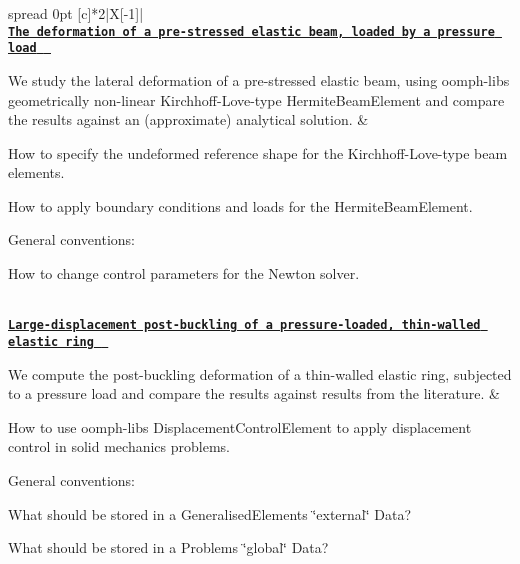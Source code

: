 \begin{longtabu} spread 0pt [c]{*{2}{|X[-1]}|}
\hline
{}\\
\href{../../beam/tensioned_string/html/index.html}{\tt {\bfseries The deformation of a pre-\/stressed elastic beam, loaded by a pressure load } }

We study the lateral deformation of a pre-\/stressed elastic beam, using {\ttfamily oomph-\/lib\textquotesingle{}s} geometrically non-\/linear Kirchhoff-\/\+Love-\/type {\ttfamily Hermite\+Beam\+Element} and compare the results against an (approximate) analytical solution.  &
\begin{DoxyItemize}
\item How to specify the undeformed reference shape for the Kirchhoff-\/\+Love-\/type beam elements.
\item How to apply boundary conditions and loads for the {\ttfamily Hermite\+Beam\+Element}.
\item General conventions\+:
\begin{DoxyItemize}
\item How to change control parameters for the Newton solver. 
\end{DoxyItemize}
\end{DoxyItemize}

\\
\href{../../beam/steady_ring/html/index.html}{\tt {\bfseries Large-\/displacement post-\/buckling of a pressure-\/loaded, thin-\/walled elastic ring } }

We compute the post-\/buckling deformation of a thin-\/walled elastic ring, subjected to a pressure load and compare the results against results from the literature.  &
\begin{DoxyItemize}
\item How to use {\ttfamily oomph-\/lib\textquotesingle{}s} {\ttfamily Displacement\+Control\+Element} to apply displacement control in solid mechanics problems.
\item General conventions\+:
\begin{DoxyItemize}
\item What should be stored in a {\ttfamily Generalised\+Element\textquotesingle{}s} \char`\"{}external\char`\"{} {\ttfamily Data}?
\item What should be stored in a {\ttfamily Problem\textquotesingle{}s} \char`\"{}global\char`\"{} {\ttfamily Data}?
\end{DoxyItemize}
\end{DoxyItemize}



\\
\end{longtabu}
